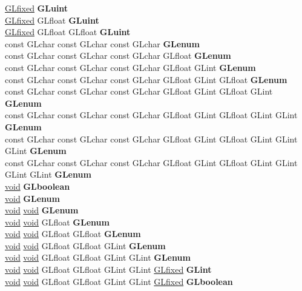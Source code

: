 \begin{DoxyCompactItemize}
\begin{tabbing}
\>\hyperlink{glheader_8h_ad6d3fa892df40dedf48ee6d84529ae5e}{GLfixed} {\bfseries GLuint}\\
\>\hyperlink{glheader_8h_ad6d3fa892df40dedf48ee6d84529ae5e}{GLfixed} GLfloat {\bfseries GLuint}\\
\>\hyperlink{glheader_8h_ad6d3fa892df40dedf48ee6d84529ae5e}{GLfixed} GLfloat GLfloat {\bfseries GLuint}\\
\>const GLchar const GLchar const GLchar {\bfseries GLenum}\\
\>const GLchar const GLchar const GLchar GLfloat {\bfseries GLenum}\\
\>const GLchar const GLchar const GLchar GLfloat GLint {\bfseries GLenum}\\
\>const GLchar const GLchar const GLchar GLfloat GLint GLfloat {\bfseries GLenum}\\
\>const GLchar const GLchar const GLchar GLfloat GLint GLfloat GLint {\bfseries GLenum}\\
\>const GLchar const GLchar const GLchar GLfloat GLint GLfloat GLint GLint {\bfseries GLenum}\\
\>const GLchar const GLchar const GLchar GLfloat GLint GLfloat GLint GLint GLint {\bfseries GLenum}\\
\>const GLchar const GLchar const GLchar GLfloat GLint GLfloat GLint GLint GLint GLint {\bfseries GLenum}\\
\>\hyperlink{interfacevoid}{void} {\bfseries GLboolean}\\
\>\hyperlink{interfacevoid}{void} {\bfseries GLenum}\\
\>\hyperlink{interfacevoid}{void} \hyperlink{interfacevoid}{void} {\bfseries GLenum}\\
\>\hyperlink{interfacevoid}{void} \hyperlink{interfacevoid}{void} GLfloat {\bfseries GLenum}\\
\>\hyperlink{interfacevoid}{void} \hyperlink{interfacevoid}{void} GLfloat GLfloat {\bfseries GLenum}\\
\>\hyperlink{interfacevoid}{void} \hyperlink{interfacevoid}{void} GLfloat GLfloat GLint {\bfseries GLenum}\\
\>\hyperlink{interfacevoid}{void} \hyperlink{interfacevoid}{void} GLfloat GLfloat GLint GLint {\bfseries GLenum}\\
\>\hyperlink{interfacevoid}{void} \hyperlink{interfacevoid}{void} GLfloat GLfloat GLint GLint \hyperlink{glheader_8h_ad6d3fa892df40dedf48ee6d84529ae5e}{GLfixed} {\bfseries GLint}\\
\>\hyperlink{interfacevoid}{void} \hyperlink{interfacevoid}{void} GLfloat GLfloat GLint GLint \hyperlink{glheader_8h_ad6d3fa892df40dedf48ee6d84529ae5e}{GLfixed} {\bfseries GLboolean}\\

\end{tabbing}
\end{DoxyCompactItemize}
